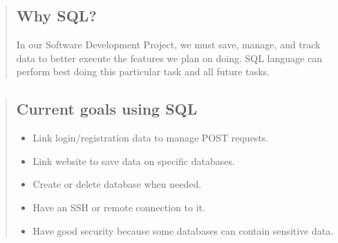 \documentclass{article}
\begin{document}
\begin{quote}
  \subsection{Why SQL?}
    In our Software Development Project, we must save, manage, and track data to better execute the features we plan on doing. SQL language can perform best doing this particular task and all future tasks.
\end{quote}

\begin{quote}
  \subsection{Current goals using SQL}
    \begin{itemize}
      \item Link login/registration data to manage POST requests.
      \item Link website to save data on specific databases.
      \item Create or delete database when needed.
      \item Have an SSH or remote connection to it.
      \item Have good security because some databases can contain sensitive data.
    \end{itemize}
\end{quote}
\end{document}
